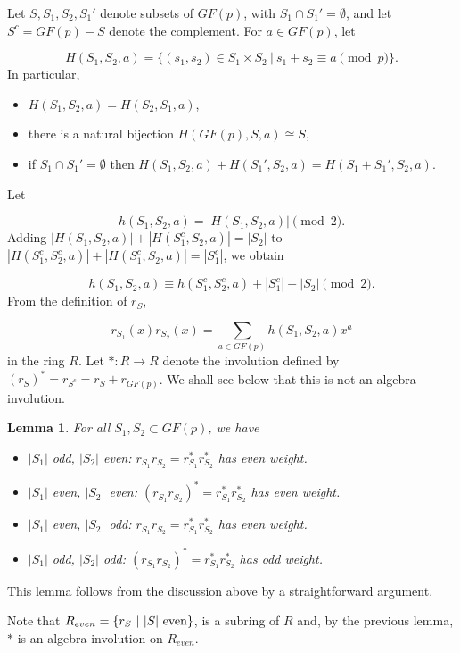 \documentclass[submission%
]{dmtcs}
\newtheorem{lemma}{Lemma}
\begin{document}
Let $S,S_1,S_2, S_1'$ denote subsets of $GF(p)$, with 
$S_1\cap S_1'=\emptyset$, and let $S^c=GF(p)-S$ denote the complement.  
For $a\in GF(p)$, let

\[
H(S_1,S_2,a) =\{(s_1,s_2)\in S_1\times S_2\ |\ s_1+s_2 \equiv a\pmod p\}.
\]
In particular,
\begin{itemize}
\item
$H(S_1,S_2,a)=H(S_2,S_1,a)$,
\item
there is a natural bijection $H(GF(p),S,a)\cong S$,
\item
if $S_1\cap S_1'=\emptyset$ then 
$H(S_1,S_2,a)+H(S_1',S_2,a)=H(S_1+S_1',S_2,a)$.
\end{itemize}
Let

\[
h(S_1,S_2,a)=|H(S_1,S_2,a)| \pmod 2.
\]
Adding $|H(S_1,S_2,a)|+|H(S_1^c,S_2,a)|=|S_2|$
to $|H(S_1^c,S_2^c,a)|+|H(S_1^c,S_2,a)|=|S_1^c|$, we obtain 

\begin{equation}
\label{eqn:n-sum}
h(S_1,S_2,a)\equiv h(S_1^c,S_2^c,a)+|S_1^c|+|S_2|\pmod 2 .
\end{equation}
From the definition of $r_S$,

\[
r_{S_1}(x)r_{S_2}(x)=\sum_{a\in GF(p)} h(S_1,S_2,a)x^a
\]
in the ring $R$. Let $*:R\rightarrow R$ denote the
involution defined by $(r_S)^*=r_{S^c}=r_S+r_{GF(p)}$.
We shall see below that this is not an algebra involution.

\begin{lemma}
\label{lemma:prod}
For all $S_1,S_2\subset GF(p)$, we have
\begin{itemize}
\item
$|S_1|$ odd, $|S_2|$ even:
$r_{S_1}r_{S_2}=r_{S_1}^*r_{S_2}^*$ has even weight.

\item
$|S_1|$ even, $|S_2|$ even:
$(r_{S_1}r_{S_2})^*=r_{S_1}^*r_{S_2}^*$ has even weight.

\item
$|S_1|$ even, $|S_2|$ odd:
$r_{S_1}r_{S_2}=r_{S_1}^*r_{S_2}^*$ has even weight.

\item
$|S_1|$ odd, $|S_2|$ odd:
$(r_{S_1}r_{S_2})^*=r_{S_1}^*r_{S_2}^*$ has odd weight.

\end{itemize}
\end{lemma}

This lemma follows from the discussion above by a straightforward
argument.

Note that $R_{even}=\{r_S\ |\ |S| \ {\rm even}\}$,
is a subring of $R$ and, by the previous lemma, 
$*$ is an algebra involution on $R_{even}$.
\end{document}
